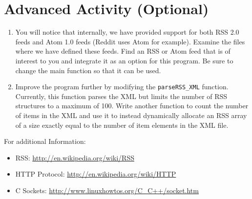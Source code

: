 \documentclass[12pt]{scrartcl}
\begin{document}
\section{Advanced Activity (Optional)}

\begin{enumerate}
  \item You will notice that internally, we have provided support for both
  RSS 2.0 feeds and Atom 1.0 feeds (Reddit uses Atom for example).  
  Examine the files where we have defined these feeds.  Find an RSS or Atom
  feed that is of interest to you and integrate it as an option for this program.
  Be sure to change the main function so that it can be used.
  
  \item Improve the program further by modifying the \texttt{parseRSS_XML} 
	function.  Currently, this function parses the XML but limits the number of 
	RSS structures to a maximum of 100.  Write another function to count the 
	number of items in the XML and use it to instead dynamically allocate an 
	RSS array of a size exactly equal to the number of item elements in the XML file.
\end{enumerate}

For additional Information:
  \begin{itemize}
    \item RSS: \url{http://en.wikipedia.org/wiki/RSS}
    \item HTTP Protocol: \url{http://en.wikipedia.org/wiki/HTTP}
    \item C Sockets: \url{http://www.linuxhowtos.org/C_C++/socket.htm}
  \end{itemize}
\end{document}
